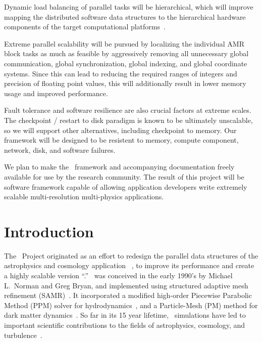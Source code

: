\documentclass[10pt,twocolumn]{article}
\begin{document}
%
Dynamic load balancing of parallel tasks will be hierarchical, which
will improve mapping the distributed software data structures to the
hierarchical hardware components of the target computational
platforms~\cite{LaTa06}.

%
Extreme parallel scalability will be pursued by localizing the
individual AMR block tasks as much as feasible by aggressively
removing all unnecessary global communication, global synchronization,
global indexing, and global coordinate systems.  Since this can lead
to reducing the required ranges of integers and precision of floating
point values, this will additionally result in lower memory usage and
improved performance.

 Fault tolerance and software
resilience are also crucial factors at extreme scales.  The checkpoint
/ restart to disk paradigm is known to be ultimately unscalable, so we
will support other alternatives, including checkpoint to memory.  Our
framework will be designed to be resistent to memory, compute
component, network, disk, and software failures.

%
We plan to make the \cello\ framework and accompanying documentation
freely available for use by the research community.  The result of
this project will be software framework capable of allowing
application developers write extremely scalable multi-resolution
multi-physics applications.

\section{Introduction} \label{s:intro}


The \cello\ Project originated as an effort to redesign the parallel
data structures of the astrophysics and cosmology application
\enzo~\cite{OsBr04}, to improve its performance and create a highly
scalable version ``\enzoii.''  \enzo\ was conceived in the early
1990's by Michael L.~Norman and Greg Bryan, and implemented using
structured adaptive mesh refinement (SAMR)~\cite{BeCo89}.  It
incorporated a modified high-order Piecewise Parabolic Method (PPM)
solver for hydrodynamics~\cite{WoCo84b}, and a Particle-Mesh (PM)
method for dark matter dynamics~\cite{@@@PM}.  So far in its 15 year
lifetime, \enzo\ simulations have led to important scientific
contributions to the fields of astrophysics, cosmology, and
turbulence~\cite{@@@enzo-science}.
\end{document}
